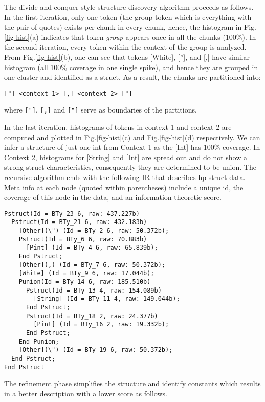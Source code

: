 \documentclass{sig-alternate-sigmod08}
\begin{document}
The divide-and-conquer style structure discovery algorithm proceeds
as follows. In the first iteration, only one token (the group
token which is everything with the pair of quotes) exists per
chunk in every chunk, hence, the histogram in Fig.\ref{fig-hist}(a) indicates
that token {\em group} appears once in all the chunks (100\%).
In the second iteration, every token within the context of the
group is analyzed. From Fig.\ref{fig-hist}(b), one can see that
tokens [White], [''], and [,] have similar histogram
(all 100\% coverage in one single spike), and hence they are
grouped in one cluster and identified as a struct. As a result,
the chunks are partitioned into:

{\small
\begin{verbatim}
["] <context 1> [,] <context 2> ["]
\end{verbatim}
}
\noindent where \verb#["]#, \verb#[,]# and \verb#["]# serve as
boundaries of the partitions.

In the last iteration, histograms of tokens in context 1 and
context 2 are computed and plotted in Fig.\ref{fig-hist}(c) and Fig.\ref{fig-hist}(d) 
respectively. We can infer a structure of just one int
from Context 1 as the [Int] has 100\% coverage. In Context 2,
histograms for [String] and [Int] are spread out and do not
show a strong struct characteristics, consequently they are 
determined to be union. The recursive algorithm ends with
the following IR that describes hp-struct data. Meta info
at each node (quoted within parentheses) include a unique id, 
the coverage of this node in the data, 
and an information-theoretic score. 
{\small
\begin{verbatim}
Pstruct(Id = BTy_23 6, raw: 437.227b)
  Pstruct(Id = BTy_21 6, raw: 432.183b)
    [Other](\") (Id = BTy_2 6, raw: 50.372b);
    Pstruct(Id = BTy_6 6, raw: 70.883b)
      [Pint] (Id = BTy_4 6, raw: 65.839b);
    End Pstruct;
    [Other](,) (Id = BTy_7 6, raw: 50.372b);
    [White] (Id = BTy_9 6, raw: 17.044b);
    Punion(Id = BTy_14 6, raw: 185.510b)
      Pstruct(Id = BTy_13 4, raw: 154.089b)
        [String] (Id = BTy_11 4, raw: 149.044b);
      End Pstruct;
      Pstruct(Id = BTy_18 2, raw: 24.377b)
        [Pint] (Id = BTy_16 2, raw: 19.332b);
      End Pstruct;
    End Punion;
    [Other](\") (Id = BTy_19 6, raw: 50.372b);
  End Pstruct;
End Pstruct
\end{verbatim}
}

The refinement phase simplifies the structure
and identify constants which results in a better
description with a lower score as follows.
\end{document}
